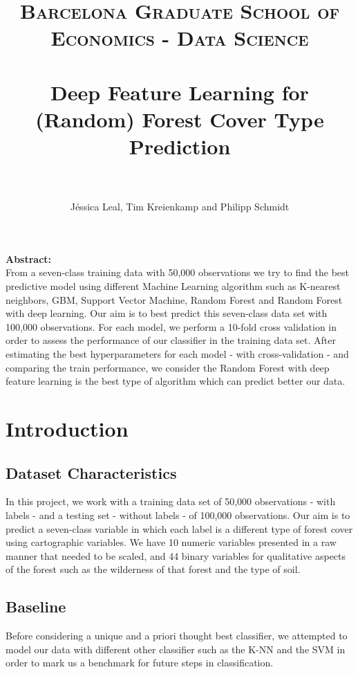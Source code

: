 \documentclass[paper=a4, fontsize=11pt]{scrartcl}
\title{	
\normalfont \normalsize 
\textsc{Barcelona Graduate School of Economics - Data Science} \\ [25pt]
\horrule{2pt} \\[0.5cm] 
\huge Deep Feature Learning for (Random) Forest Cover Type Prediction  \\ 
\horrule{2pt} \\[0.5cm] 
}
\author{J\'essica Leal, Tim Kreienkamp and Philipp Schmidt}
\date{}
\numberwithin{equation}{section}
\numberwithin{figure}{section}
\numberwithin{table}{section}
\begin{document}


\maketitle
\textbf{Abstract:} \\
From a seven-class training data with 50,000 observations we try to find the best predictive model using different Machine Learning algorithm such as K-nearest neighbors, GBM, Support Vector Machine, Random Forest and Random Forest with deep learning. Our aim is to best predict this seven-class data set with 100,000 observations. For each model, we perform a 10-fold cross validation in order to assess the performance of our classifier in the training data set. After estimating the best hyperparameters for each model - with cross-validation - and comparing the train performance, we consider the Random Forest with deep feature learning is the best type of algorithm which can predict better our data. 





\section{Introduction}
\subsection{Dataset Characteristics}
In this project, we work with a training data set of 50,000 observations - with labels - and a testing set - without labels - of 100,000 observations. Our aim is to predict a seven-class variable in which each label is a different type of forest cover using cartographic variables. We have 10 numeric variables presented in a raw manner that needed to be scaled, and 44 binary variables for qualitative aspects of the forest such as the wilderness of that forest and the type of soil. 

\newpage



\subsection{Baseline}
Before considering a unique and a priori thought best classifier, we attempted to model our data with different other classifier such as the K-NN and the SVM in order to mark us a benchmark for future steps in classification.
\end{document}
